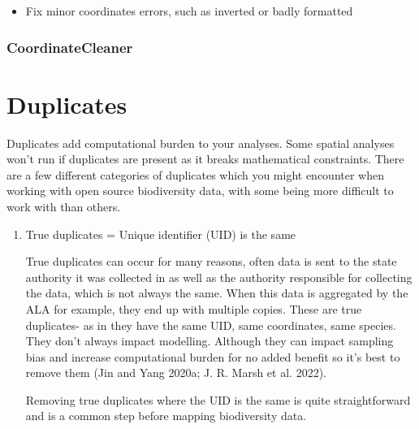 \documentclass[
  letterpaper,
  DIV=11,
  numbers=noendperiod,
  oneside]{scrreprt}
\providecommand{\tightlist}{%
  \setlength{\itemsep}{0pt}\setlength{\parskip}{0pt}}\usepackage{longtable,booktabs,array}
\begin{document}
\begin{itemize}
\tightlist
\item
  Fix minor coordinates errors, such as inverted or badly formatted
\end{itemize}

\hypertarget{section}{%
\subsection{}\label{section}}

\hypertarget{coordinatecleaner}{%
\subsection{CoordinateCleaner}\label{coordinatecleaner}}


\hypertarget{duplicates}{%
\chapter{Duplicates}\label{duplicates}}

Duplicates add computational burden to your analyses. Some spatial
analyses won't run if duplicates are present as it breaks mathematical
constraints. There are a few different categories of duplicates which
you might encounter when working with open source biodiversity data,
with some being more difficult to work with than others.

\begin{enumerate}
\def\labelenumi{\arabic{enumi}.}
\item
  True duplicates = Unique identifier (UID) is the same

  True duplicates can occur for many reasons, often data is sent to the
  state authority it was collected in as well as the authority
  responsible for collecting the data, which is not always the same.
  When this data is aggregated by the ALA for example, they end up with
  multiple copies. These are true duplicates- as in they have the same
  UID, same coordinates, same species. They don't always impact
  modelling. Although they can impact sampling bias and increase
  computational burden for no added benefit so it's best to remove them
  (Jin and Yang 2020a; J. R. Marsh et al. 2022).

  Removing true duplicates where the UID is the same is quite
  straightforward and is a common step before mapping biodiversity data.
\end{enumerate}
\end{document}
